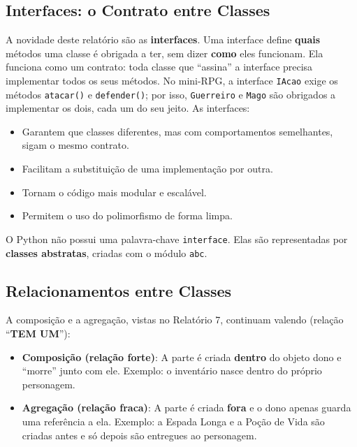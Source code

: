 \subsection{Interfaces: o Contrato entre Classes}

A novidade deste relatório são as \textbf{interfaces}. Uma interface define \textbf{quais}
métodos uma classe é obrigada a ter, sem dizer \textbf{como} eles funcionam. Ela funciona como
um contrato: toda classe que ``assina'' a interface precisa implementar todos os seus métodos. No
mini-RPG, a interface \texttt{IAcao} exige os métodos \texttt{atacar()} e \texttt{defender()};
por isso, \texttt{Guerreiro} e \texttt{Mago} são obrigados a implementar os dois, cada um do seu
jeito. As interfaces:

\begin{itemize}
    \item Garantem que classes diferentes, mas com comportamentos semelhantes, sigam o mesmo
    contrato.
    \item Facilitam a substituição de uma implementação por outra.
    \item Tornam o código mais modular e escalável.
    \item Permitem o uso do polimorfismo de forma limpa.
\end{itemize}

O Python não possui uma palavra-chave \texttt{interface}. Elas são representadas por
\textbf{classes abstratas}, criadas com o módulo \texttt{abc}.

\subsection{Relacionamentos entre Classes}

A composição e a agregação, vistas no Relatório 7, continuam valendo (relação
``\textbf{TEM UM}''):

\begin{itemize}
    \item \textbf{Composição (relação forte)}: A parte é criada \textbf{dentro} do objeto dono e
    ``morre'' junto com ele. Exemplo: o inventário nasce dentro do próprio personagem.

    \item \textbf{Agregação (relação fraca)}: A parte é criada \textbf{fora} e o dono apenas
    guarda uma referência a ela. Exemplo: a Espada Longa e a Poção de Vida são criadas antes e
    só depois são entregues ao personagem.
\end{itemize}


